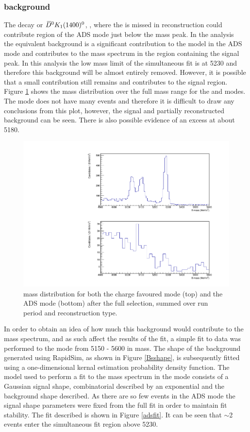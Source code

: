 \subsubsection{\boldmath {} background}
\label{sec:backgrounds:bs}

The decay  or ${{\kern 0.2em\overline{\kern -0.2em D}{}}{}^0} K_1(1400)^0$, , where the \pip is missed in reconstruction could contribute region of the \pik ADS mode just below the \Bm mass peak. In the  analysis~\cite{LHCb-PAPER-2016-003} the equivalent  background is a significant contribution to the model in the \pik ADS mode and contributes to the \Bm mass spectrum in the region containing the signal peak. In this analysis the low mass limit of the simultaneous fit is at 5230 \mev and therefore this background will be almost entirely removed. However, it is possible that a small contribution still remains and contributes to the signal region. Figure \ref{adsfullrange} shows the \B mass distribution over the full mass range for the \kpi and \pik modes. The \pik mode does not have many events and therefore it is difficult to draw any conclusions from this plot, however, the signal and partially reconstructed background can be seen. There is also possible evidence of an excess at about 5180\mev.

\begin{figure}
\centering
\includegraphics[width=0.6\linewidth]{figures/backgrounds/adsfullrange.pdf}
\caption{\B mass distribution for both the charge favoured \kpi mode (top) and the ADS mode (bottom) after the full selection, summed over run period and \KS reconstruction type.}
\label{adsfullrange}
\end{figure}

In order to obtain an idea of how much this \Bs background would contribute to the \Bm mass spectrum, and as such affect the results of the fit, a simple fit to data was performed to the \pik mode from 5150 - 5600 \mev in \Bm mass. The shape of the \Bs background generated using RapidSim, as shown in Figure \ref{Bsshape}, is subsequently fitted using a one-dimensional kernal estimation probability density function. The model used to perform a fit to the \Bm mass spectrum in the \pik mode consists of a Gaussian signal shape, combinatorial described by an exponential and the \Bs background shape described. As there are so few events in the ADS mode the signal shape parameters were fixed from the full fit in order to maintain fit stability. The fit described is shown in Figure \ref{adsfit}. It can be seen that $\sim$2 \Bs events enter the simultaneous fit region above 5230\mev.

